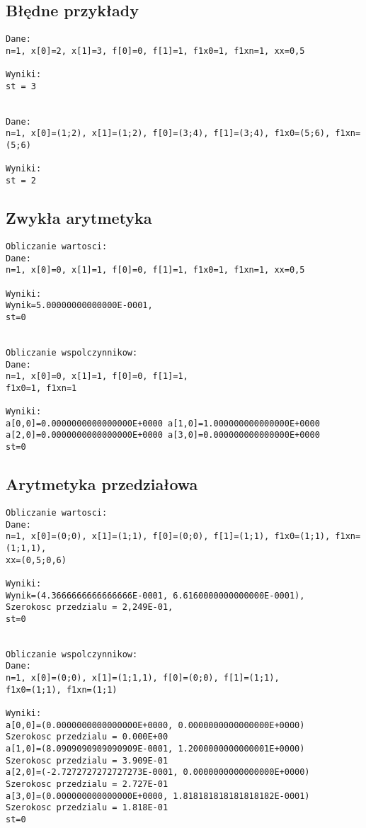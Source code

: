 \documentclass[a4paper, 10pt]{article}
\begin{document}
\subsection*{Błędne przykłady}
\begin{lstlisting}
Dane:
n=1, x[0]=2, x[1]=3, f[0]=0, f[1]=1, f1x0=1, f1xn=1, xx=0,5

Wyniki:
st = 3


Dane:
n=1, x[0]=(1;2), x[1]=(1;2), f[0]=(3;4), f[1]=(3;4), f1x0=(5;6), f1xn=(5;6)

Wyniki:
st = 2
\end{lstlisting}

\subsection*{Zwykła arytmetyka}

\begin{lstlisting}
Obliczanie wartosci:
Dane:
n=1, x[0]=0, x[1]=1, f[0]=0, f[1]=1, f1x0=1, f1xn=1, xx=0,5

Wyniki:
Wynik=5.00000000000000E-0001,
st=0


Obliczanie wspolczynnikow:
Dane:
n=1, x[0]=0, x[1]=1, f[0]=0, f[1]=1,
f1x0=1, f1xn=1

Wyniki: 
a[0,0]=0.0000000000000000E+0000	a[1,0]=1.000000000000000E+0000
a[2,0]=0.0000000000000000E+0000	a[3,0]=0.000000000000000E+0000
st=0
\end{lstlisting}

\subsection*{Arytmetyka przedziałowa}

\begin{lstlisting}
Obliczanie wartosci:
Dane:
n=1, x[0]=(0;0), x[1]=(1;1), f[0]=(0;0), f[1]=(1;1), f1x0=(1;1), f1xn=(1;1,1),
xx=(0,5;0,6)

Wyniki:
Wynik=(4.3666666666666666E-0001, 6.6160000000000000E-0001),
Szerokosc przedzialu = 2,249E-01,
st=0


Obliczanie wspolczynnikow:
Dane:
n=1, x[0]=(0;0), x[1]=(1;1,1), f[0]=(0;0), f[1]=(1;1),
f1x0=(1;1), f1xn=(1;1)

Wyniki: 
a[0,0]=(0.0000000000000000E+0000, 0.0000000000000000E+0000)
Szerokosc przedzialu = 0.000E+00
a[1,0]=(8.0909090909090909E-0001, 1.2000000000000001E+0000)
Szerokosc przedzialu = 3.909E-01
a[2,0]=(-2.7272727272727273E-0001, 0.0000000000000000E+0000)
Szerokosc przedzialu = 2.727E-01
a[3,0]=(0.000000000000000E+0000, 1.818181818181818182E-0001)
Szerokosc przedzialu = 1.818E-01
st=0

\end{lstlisting}
\end{document}
